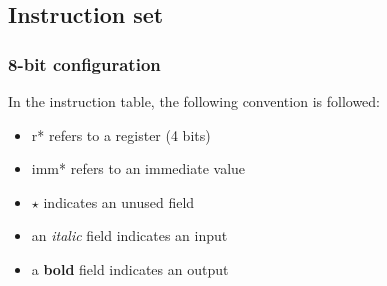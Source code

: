 \documentclass[a4paper,12pt]{article}
\begin{document}
\subsection{Instruction set}
\subsubsection{8-bit configuration}

In the instruction table, the following convention is followed:
\begin{itemize}
    \item r* refers to a register (4 bits)
    \item imm* refers to an immediate value
    \item $\star$ indicates an unused field
    \item an \textit{italic} field indicates an input
    \item a \textbf{bold} field indicates an output
\end{itemize}
\end{document}
